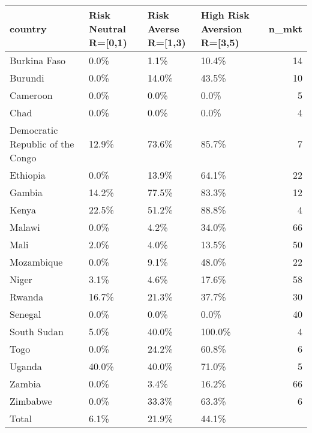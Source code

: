 \begin{table}[ht]
\centering
\begin{tabular}{llllr}
  \hline
country & Risk Neutral R=[0,1) & Risk Averse R=[1,3) & High Risk Aversion R=[3,5) & n\_mkt \\ 
  \hline
Burkina Faso & 0.0\% & 1.1\% & 10.4\% & 14 \\ 
  Burundi & 0.0\% & 14.0\% & 43.5\% & 10 \\ 
  Cameroon & 0.0\% & 0.0\% & 0.0\% & 5 \\ 
  Chad & 0.0\% & 0.0\% & 0.0\% & 4 \\ 
  Democratic Republic of the Congo & 12.9\% & 73.6\% & 85.7\% & 7 \\ 
  Ethiopia & 0.0\% & 13.9\% & 64.1\% & 22 \\ 
  Gambia & 14.2\% & 77.5\% & 83.3\% & 12 \\ 
  Kenya & 22.5\% & 51.2\% & 88.8\% & 4 \\ 
  Malawi & 0.0\% & 4.2\% & 34.0\% & 66 \\ 
  Mali & 2.0\% & 4.0\% & 13.5\% & 50 \\ 
  Mozambique & 0.0\% & 9.1\% & 48.0\% & 22 \\ 
  Niger & 3.1\% & 4.6\% & 17.6\% & 58 \\ 
  Rwanda & 16.7\% & 21.3\% & 37.7\% & 30 \\ 
  Senegal & 0.0\% & 0.0\% & 0.0\% & 40 \\ 
  South Sudan & 5.0\% & 40.0\% & 100.0\% & 4 \\ 
  Togo & 0.0\% & 24.2\% & 60.8\% & 6 \\ 
  Uganda & 40.0\% & 40.0\% & 71.0\% & 5 \\ 
  Zambia & 0.0\% & 3.4\% & 16.2\% & 66 \\ 
  Zimbabwe & 0.0\% & 33.3\% & 63.3\% & 6 \\ 
  Total & 6.1\% & 21.9\% & 44.1\% &  \\ 
   \hline
\end{tabular}
\end{table}
